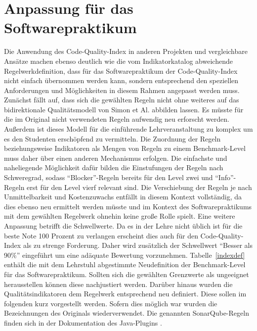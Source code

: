 \documentclass[da,ngerman]{stthesis}
\begin{document}
		\section{Anpassung für das Softwarepraktikum}
			Die Anwendung des Code-Quality-Index in anderen Projekten und vergleichbare Ansätze machen ebenso deutlich wie die vom Indikatorkatalog abweichende Regelwerkdefinition, dass für das Softwarepraktikum der Code-Quality-Index nicht einfach übernommen werden kann, sondern entsprechend den speziellen Anforderungen und Möglichkeiten in diesem Rahmen angepasst werden muss. \newline
			Zunächst fällt auf, dass sich die gewählten Regeln nicht ohne weiteres auf das bidirektionale Qualitätsmodell von Simon et Al. abbilden lassen. Es müsste für die im Original nicht verwendeten Regeln aufwendig neu erforscht werden. Außerdem ist dieses Modell für die einführende Lehrveranstaltung zu komplex um es den Studenten erschöpfend zu vermitteln. Die Zuordnung der Regeln beziehungsweise Indikatoren als Mengen von Regeln zu einem Benchmark-Level muss daher über einen anderen Mechanismus erfolgen. Die einfachste und naheliegende Möglichkeit dafür bilden die Einstufungen der Regeln nach Schweregrad, sodass "`Blocker"'-Regeln bereits für den Level zwei und "`Info"'-Regeln erst für den Level vierf relevant sind. Die Verschiebung der Regeln je nach Unmittelbarkeit und Kostenzuwachs entfällt in diesem Kontext vollständig, da dies ebenso neu ermittelt werden müsste und im Kontext des Softwarepraktikums mit dem gewählten Regelwerk ohnehin keine große Rolle spielt. \newline
			Eine weitere Anpassung betrifft die Schwellwerte. Da es in der Lehre nicht üblich ist für die beste Note 100 Prozent zu verlangen erscheint dies auch für den Code-Quality-Index als zu strenge Forderung. Daher wird zusätzlich der Schwellwert "`Besser als 90\%"' eingeführt um eine adäquate Bewertung vorzunehmen. Tabelle~\ref{indexdef} enthält die mit dem Lehrstuhl abgestimmte Neudefinition der Benchmark-Level für das Softwarepraktikum. Sollten sich die gewählten Grenzwerte als ungeeignet herausstellen können diese nachjustiert werden. \newline 
			Darüber hinaus wurden die Qualitätsindikatoren dem Regelwerk entsprechend neu definiert. Diese sollen im folgenden kurz vorgestellt werden. Sofern dies möglich war wurden die Bezeichnungen des Originals wiederverwendet. Die genannten SonarQube-Regeln finden sich in der Dokumentation des Java-Plugins \cite{JavaPlugin}. \newline
\end{document}
